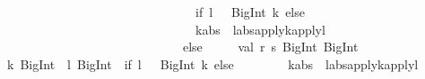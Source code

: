 \begin{isabellebody}
\begin{isamarkuptext}
\ \ \ \ \ \ \ \ \ \ \ \ \ \ \ \ \ \ \ \ \ \ \ \ \ \ \ \ \ \ \ \ \ \ \ \ if\ {}l\ {}{}\ {}{}\ {}BigInt{}{}{}{}\ k{}\ else\isanewline
\ \ \ \ \ \ \ \ \ \ \ \ \ \ \ \ \ \ \ \ \ \ \ \ \ \ \ \ \ \ \ \ \ \ \ \ {}k{}abs\ {}{}\ l{}abs{}{}{}apply{}k{}{}apply{}l{}\isanewline
\ \ \ \ \ \ \ \ \ \ \ \ \ \ \ \ \ \ \ \ \ \ \ \ \ \ \ \ \ \ \ \ \ \ else\ {}\isanewline
\ \ \ \ val\ {}r{}\ s{}{}\ {}BigInt{}\ BigInt{}\ {}\isanewline
\ \ \ \ \ \ {}{}k{}\ BigInt{}\ {}{}\ {}l{}\ BigInt{}\ {}{}\ if\ {}l\ {}{}\ {}{}\ {}BigInt{}{}{}{}\ k{}\ else\isanewline
\ \ \ \ \ \ \ \ {}k{}abs\ {}{}\ l{}abs{}{}{}apply{}k{}{}apply{}l{}{}\isanewline

\end{isamarkuptext}
\end{isabellebody}
